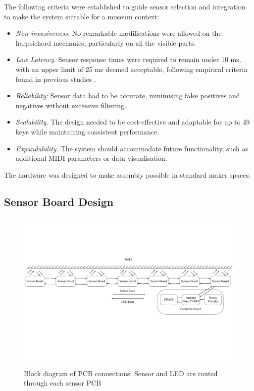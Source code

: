 
The following criteria were established to guide sensor selection and integration to make the system suitable for a museum context:

\begin{itemize}
    \item \emph{Non-invasiveness.} No remarkable modifications were allowed on the harpsichord mechanics, particularly on all the visible parts.
    \item \emph{Low Latency.} Sensor response times were required to remain under 10 ms, with an upper limit of 25 ms deemed acceptable, following empirical criteria found in previous studies \cite{Jack2016}.
    \item \emph{Reliability:} Sensor data had to be accurate, minimising false positives and negatives without excessive filtering.
    \item \emph{Scalability.} The design needed to be cost-effective and adaptable for up to 49 keys while maintaining consistent performance.
    \item \emph{Expandability.} The system should accommodate future functionality, such as additional MIDI parameters or data visualisation.
\end{itemize}

The hardware was designed to make assembly possible in standard maker spaces.  

\subsection{Sensor Board Design}\label{sensor-board}

\begin{figure}
    \centering
    \includegraphics[width=\linewidth]{src/images/block-diagram.pdf}
    \caption{Block diagram of PCB connections. Sensor and LED are routed through each sensor PCB}
    \label{fig:system-block-diagram}
\end{figure}

